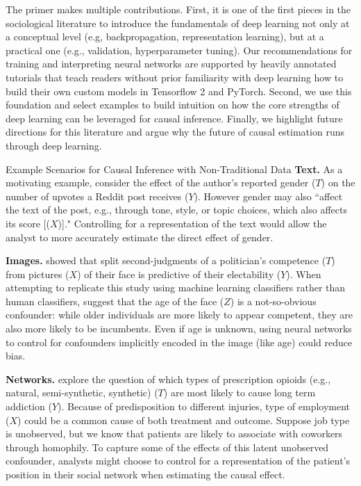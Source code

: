 The primer makes multiple contributions. First, it is one of the first pieces in the sociological literature to introduce the fundamentals of deep learning not only at a conceptual level (e.g, backpropagation, representation learning), but at a practical one (e.g., validation, hyperparameter tuning). Our recommendations for training and interpreting neural networks are supported by heavily annotated tutorials that teach readers without prior familiarity with deep learning how to build their own custom models in Tensorflow 2 and PyTorch. Second, we use this foundation and select examples to build intuition on how the core strengths of deep learning can be leveraged for causal inference. Finally, we highlight future directions for this literature and argue why the future of causal estimation runs through deep learning.

\begin{TCBBox}[label=Box:nontradex]{Example Scenarios for Causal Inference with Non-Traditional Data}
\textbf{Text.} As a motivating example, \citet{Veitch2019UsingTE} consider the effect of the author's reported gender ($T$) on the number of upvotes a Reddit post receives ($Y$). However gender may also ``affect the text of the post, e.g., through tone, style, or topic
choices, which also affects its score [($X$)]." Controlling for a representation of the text would allow the analyst to more accurately estimate the direct effect of gender.

\textbf{Images.} \citet{todorov2005inferences} showed that split second-judgments of a politician's competence ($T$) from pictures ($X$) of their face is predictive of their electability ($Y$). When attempting to replicate this study using machine learning classifiers rather than human classifiers, \citet{joo2015automated} suggest that the age of the face ($Z$) is a not-so-obvious confounder: while older individuals are more likely to appear competent, they are also more likely to be incumbents. Even if age is unknown, using neural networks to control for confounders implicitly encoded in the image (like age) could reduce bias.

\textbf{Networks.} \citet{nagpal2020} explore the question of which types of prescription opioids (e.g., natural, semi-synthetic, synthetic) ($T$) are most likely to cause long term addiction ($Y$). Because of predisposition to different injuries, type of employment ($X$) could be a common cause of both treatment and outcome. Suppose job type is unobserved, but we know that patients are likely to associate with coworkers through homophily. To capture some of the effects of this latent unobserved confounder, analysts might choose to control for a representation of the patient's position in their social network when estimating the causal effect.

\end{TCBBox}